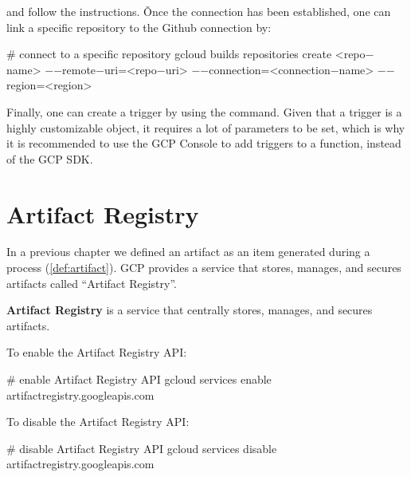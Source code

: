 and follow the instructions. \v

Once the connection has been established, one can link a specific repository to the Github connection by:
\begin{bash}
# connect to a specific repository
gcloud builds repositories create <repo$-$name>
    $-$$-$remote$-$uri=<repo$-$uri>
    $-$$-$connection=<connection$-$name>
    $-$$-$region=<region>
\end{bash}

Finally, one can create a trigger by using the  command. Given that a trigger is a
highly customizable object, it requires a lot of parameters to be set, which is why it is recommended to use the GCP
Console to add triggers to a function, instead of the GCP SDK\@.

\section{Artifact Registry}\label{sec:artifact_registry}

In a previous chapter we defined an artifact as an item generated during a process (\ref{def:artifact}). GCP provides a
service that stores, manages, and secures artifacts called ``Artifact Registry''.

\textbf{Artifact Registry} is a service that centrally stores, manages, and secures artifacts.
\ed

To enable the Artifact Registry API:
\begin{bash}
# enable Artifact Registry API
gcloud services enable artifactregistry.googleapis.com
\end{bash}

To disable the Artifact Registry API:
\begin{bash}
# disable Artifact Registry API
gcloud services disable artifactregistry.googleapis.com
\end{bash}

